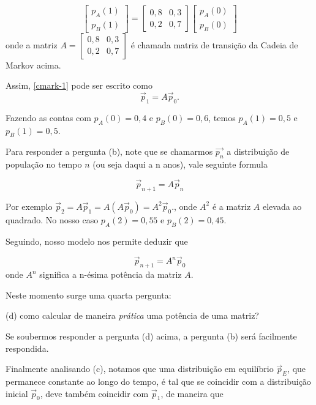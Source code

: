 \documentclass[../livro.tex]{subfiles}  %
\begin{document}
$$\left[ \begin{array}{c} p_A(1)
\\ p_B(1)
\end{array} \right]  =
\left[ \begin{array}{cc} 0,8 & 0,3
\\ 0,2 & 0,7
\end{array} \right]
\left[ \begin{array}{c} p_A(0)
\\ p_B(0)
\end{array} \right]  $$
onde a matriz $A=\left[ \begin{array}{cc} 0,8 & 0,3
\\ 0,2 & 0,7
\end{array} \right]$
é chamada matriz de transição da Cadeia de Markov acima.

Assim, \eqref{cmark-1} pode ser escrito como
$$ \vec p_1 = A \vec p_0.$$

Fazendo as contas com $p_A(0)=0,4$ e $p_B(0)=0,6$, temos $p_A(1)=0,5$ e $p_B(1)=0,5$.

\medskip

Para responder a pergunta (b), note que se chamarmos $\vec{p_n}$ a distribuição de população no tempo $n$ (ou seja daqui a n anos), vale seguinte formula

\begin{equation}\label{cmark-2}
\vec p_{n+1} = A \vec p_n
\end{equation}

Por exemplo $ \vec p_2 = A \vec p_1= A (A \vec p_0)= A^2 \vec p_0.$, onde $A^2$ é a matriz $A$ elevada ao quadrado.
No nosso caso $p_A(2)=0,55$ e $p_B(2)=0,45$.

Seguindo, nosso modelo nos permite deduzir que

$$ \vec p_{n+1} = A^n \vec p_0$$
onde $A^n$ significa a n-ésima potência da matriz $A$.

Neste momento surge uma quarta pergunta:

\medskip

(d) como calcular de maneira {\it prática} uma potência de uma matriz?

\medskip

Se soubermos responder a pergunta (d) acima, a pergunta (b) será facilmente respondida.

\medskip

Finalmente analisando (c), notamos que uma distribuição em equilíbrio $\vec{p}_E$, que permanece constante ao longo do tempo, é tal que se coincidir com a  distribuição inicial $\vec p_0$, deve também coincidir com $\vec p_1$, de maneira que
\end{document}
